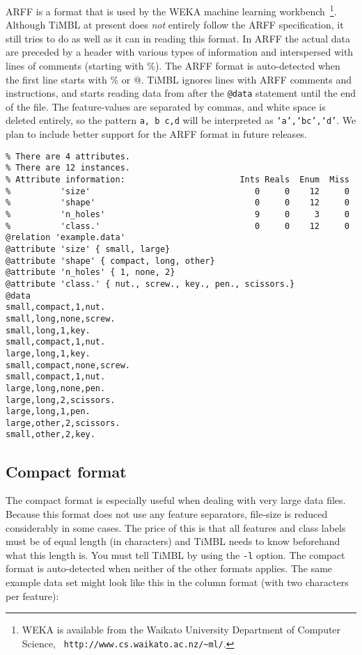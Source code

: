 \documentclass{report}
\begin{document}
ARFF is a format that is used by the WEKA machine learning
workbench~\cite{Garner95}\footnote{WEKA is available from the Waikato
University Department of Computer Science, {\tt
http://www.cs.waikato.ac.nz/\~{}ml/}.}.  Although TiMBL at present
does {\em not} entirely follow the ARFF specification, it still tries to do
as well as it can in reading this format. In ARFF the actual data are
preceded by a header with various types of information and
interspersed with lines of comments (starting with \%). The ARFF
format is auto-detected when the first line starts with \% or @. TiMBL
ignores lines with ARFF comments and instructions, and starts reading
data from after the {\tt @data} statement until the end of the
file. The feature-values are separated by commas, and white space is
deleted entirely, so the pattern {\tt a, b c,d} will be interpreted as
{\tt `a',`bc',`d'}. We plan to include better support for the
ARFF format in future releases.

\begin{verbatim}
% There are 4 attributes.
% There are 12 instances.
% Attribute information:                       Ints Reals  Enum  Miss
%          'size'                                 0     0    12     0   
%          'shape'                                0     0    12     0   
%          'n_holes'                              9     0     3     0   
%          'class.'                               0     0    12     0   
@relation 'example.data'
@attribute 'size' { small, large}
@attribute 'shape' { compact, long, other}
@attribute 'n_holes' { 1, none, 2}
@attribute 'class.' { nut., screw., key., pen., scissors.}
@data
small,compact,1,nut.
small,long,none,screw.
small,long,1,key.
small,compact,1,nut.
large,long,1,key.
small,compact,none,screw.
small,compact,1,nut.
large,long,none,pen.
large,long,2,scissors.
large,long,1,pen.
large,other,2,scissors.
small,other,2,key.
\end{verbatim}

\subsection{Compact format}
\label{compactformat}

The compact format is especially useful when dealing with very large
data files. Because this format does not use any feature separators,
file-size is reduced considerably in some cases. The price of this is
that all features and class labels must be of equal length (in
characters) and TiMBL needs to know beforehand what this length
is. You must tell TiMBL by using the {\tt -l} option. The compact
format is auto-detected when neither of the other formats applies. The
same example data set might look like this in the column format (with
two characters per feature):
\end{document}
